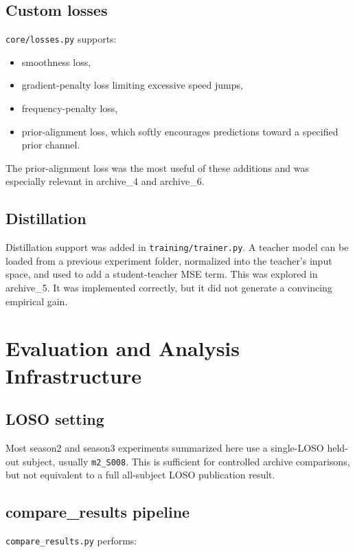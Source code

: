 \documentclass[11pt,a4paper]{article}
\begin{document}
\subsection{Custom losses}

\texttt{core/losses.py} supports:

\begin{itemize}
\item smoothness loss,
\item gradient-penalty loss limiting excessive speed jumps,
\item frequency-penalty loss,
\item prior-alignment loss, which softly encourages predictions toward a specified prior channel.
\end{itemize}

The prior-alignment loss was the most useful of these additions and was especially relevant in archive\_4 and archive\_6.

\subsection{Distillation}

Distillation support was added in \texttt{training/trainer.py}. A teacher model can be loaded from a previous experiment folder, normalized into the teacher's input space, and used to add a student-teacher MSE term. This was explored in archive\_5. It was implemented correctly, but it did not generate a convincing empirical gain.

\section{Evaluation and Analysis Infrastructure}

\subsection{LOSO setting}

Most season2 and season3 experiments summarized here use a single-LOSO held-out subject, usually \texttt{m2\_S008}. This is sufficient for controlled archive comparisons, but not equivalent to a full all-subject LOSO publication result.

\subsection{compare\_results pipeline}

\texttt{compare\_results.py} performs:
\end{document}
